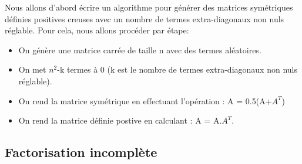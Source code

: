 Nous allons d'abord écrire un algorithme pour générer des matrices symétriques définies positives creuses avec un nombre de termes extra-diagonaux non nuls réglable. Pour cela, nous allons procéder par étape:
\begin{itemize}
    \item On génère une matrice carrée de taille n avec des termes aléatoires.
    \item On met $n^2$-k termes à 0 (k est le nombre de termes extra-diagonaux non nuls réglable).
    \item On rend la matrice symétrique en effectuant l'opération : A = 0.5(A+$A^{T}$)
    \item On rend la matrice définie postive en calculant : A = A.$A^{T}$.

\end{itemize}

\subsection{Factorisation incomplète}
\label{ssec:factor_incompl}

